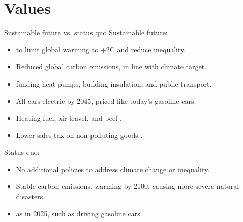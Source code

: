 \documentclass[aspectratio=169,xcolor=dvipsnames, 11pt,mathserif]{beamer}
\begin{document}

\section{Values}

\begin{frame}{Sustainable future vs. status quo}
Sustainable future:
\begin{itemize}
    \item {} to limit global warming to +2\textdegree{}C and reduce inequality.
    \item Reduced global carbon emissions, in line with climate target.
    \item {} funding heat pumps, building insulation, and public transport.
    \item All cars electric by 2045, priced like today's gasoline cars.
    \item Heating fuel, air travel, and beef . 
    \item Lower sales tax on non-polluting goods .
\end{itemize}
Status quo:
\begin{itemize}
    \item No additional policies to address climate change or inequality. 
    \item Stable carbon emissions.  warming by 2100, causing more severe natural disasters.
    \item {} as in 2025, such as driving gasoline cars.
\end{itemize}
\end{frame}
\end{document}
